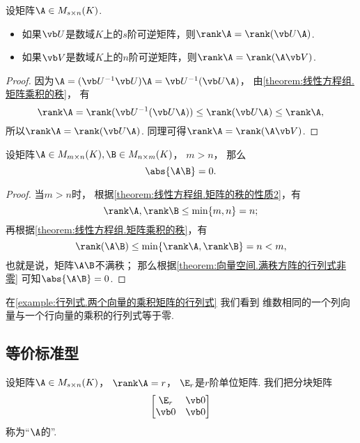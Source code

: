 \begin{corollary}\label{theorem:矩阵乘积的秩.与可逆矩阵相乘不变秩}
设矩阵\(\A \in M_{s \times n}(K)\).
\begin{itemize}
	\item 如果\(\P\)是数域\(K\)上的\(s\)阶可逆矩阵，则\(\rank\A = \rank(\P\A)\).
	\item 如果\(\Q\)是数域\(K\)上的\(n\)阶可逆矩阵，则\(\rank\A = \rank(\A\Q)\).
\end{itemize}
\begin{proof}
因为\(\A = (\P^{-1} \P) \A = \P^{-1} (\P \A)\)，
由\cref{theorem:线性方程组.矩阵乘积的秩}，
有\[
	\rank\A = \rank(\P^{-1}(\P\A)) \leq \rank(\P\A) \leq \rank\A,
\]
所以\(\rank\A = \rank(\P\A)\).
同理可得\(\rank\A = \rank(\A\Q)\).
\end{proof}
\end{corollary}

\begin{theorem}\label{theorem:矩阵乘积的秩.多行少列矩阵与少行多列矩阵的乘积的行列式}
设矩阵\(\A \in M_{m \times n}(K),
\B \in M_{n \times m}(K)\)，
\(m > n\)，
那么\[
	\abs{\A\B} = 0.
\]
\begin{proof}
当\(m>n\)时，
根据\cref{theorem:线性方程组.矩阵的秩的性质2}，有\[
	\rank\A,\rank\B \leq \min\{m,n\} = n;
\]
再根据\cref{theorem:线性方程组.矩阵乘积的秩}，有\[
	\rank(\A\B) \leq \min\{\rank\A,\rank\B\} = n < m,
\]
也就是说，矩阵\(\A\B\)不满秩；
那么根据\cref{theorem:向量空间.满秩方阵的行列式非零} 可知\(\abs{\A\B} = 0\).
\end{proof}
\end{theorem}
\begin{remark}
在\cref{example:行列式.两个向量的乘积矩阵的行列式} 我们看到
维数相同的一个列向量与一个行向量的乘积的行列式等于零.
\end{remark}

\subsection{等价标准型}
\begin{definition}
设矩阵\(\A \in M_{s \times n}(K)\)，
\(\rank\A = r\)，
\(\E_r\)是\(r\)阶单位矩阵.
我们把分块矩阵\[
	\begin{bmatrix}
		\E_r & \vb0 \\
		\vb0 & \vb0
	\end{bmatrix}
\]
称为“\(\A\)的”.
\end{definition}

